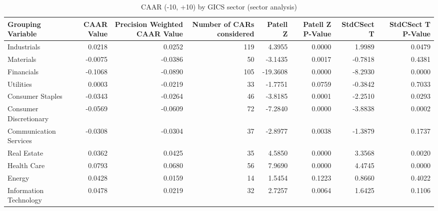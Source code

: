 \begin{table}
\caption{CAAR (-10, +10) by GICS sector (sector analysis)}
\label{tab:sector_caar}
\begin{tabular}{lrrrrrrr}
\toprule
Grouping Variable & CAAR Value & Precision Weighted CAAR Value & Number of CARs considered & Patell Z & Patell Z P-Value & StdCSect T & StdCSect T P-Value \\
\midrule
Industrials & 0.0218 & 0.0252 & 119 & 4.3955 & 0.0000 & 1.9989 & 0.0479 \\
Materials & -0.0075 & -0.0386 & 50 & -3.1435 & 0.0017 & -0.7818 & 0.4381 \\
Financials & -0.1068 & -0.0890 & 105 & -19.3608 & 0.0000 & -8.2930 & 0.0000 \\
Utilities & 0.0003 & -0.0219 & 33 & -1.7751 & 0.0759 & -0.3842 & 0.7033 \\
Consumer Staples & -0.0343 & -0.0264 & 46 & -3.8185 & 0.0001 & -2.2510 & 0.0293 \\
Consumer Discretionary & -0.0569 & -0.0609 & 72 & -7.2840 & 0.0000 & -3.8838 & 0.0002 \\
Communication Services & -0.0308 & -0.0304 & 37 & -2.8977 & 0.0038 & -1.3879 & 0.1737 \\
Real Estate & 0.0362 & 0.0425 & 35 & 4.5850 & 0.0000 & 3.3568 & 0.0020 \\
Health Care & 0.0793 & 0.0680 & 56 & 7.9690 & 0.0000 & 4.4745 & 0.0000 \\
Energy & 0.0428 & 0.0159 & 14 & 1.5454 & 0.1223 & 0.8660 & 0.4022 \\
Information Technology & 0.0478 & 0.0219 & 32 & 2.7257 & 0.0064 & 1.6425 & 0.1106 \\
\bottomrule
\end{tabular}
\end{table}
